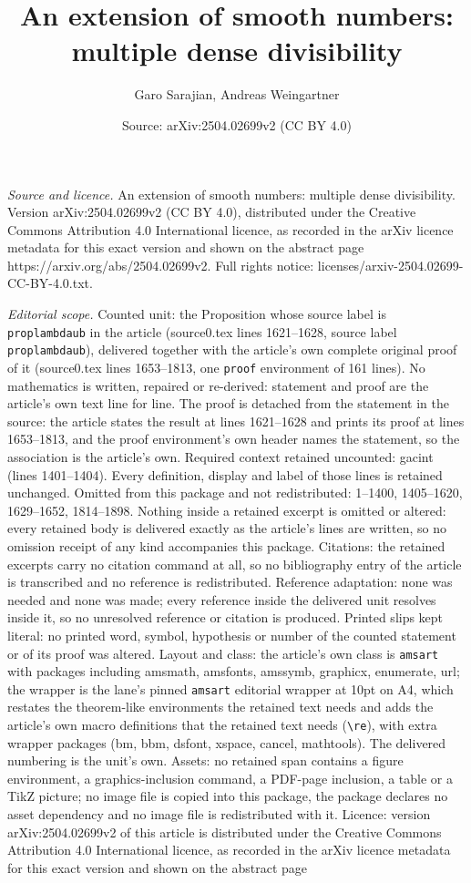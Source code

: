 \documentclass[10pt,a4paper]{amsart}
\title[An extension of smooth numbers: multiple dense divisibility]{An extension of smooth numbers: multiple dense divisibility}
\author{Garo Sarajian, Andreas Weingartner}
\date{Source: arXiv:2504.02699v2 (CC BY 4.0)}
\begin{document}
\maketitle

\noindent\emph{Source and licence.} An extension of smooth numbers: multiple dense divisibility. Version arXiv:2504.02699v2 (CC BY 4.0), distributed under the Creative Commons Attribution 4.0 International licence, as recorded in the arXiv licence metadata for this exact version and shown on the abstract page https://arxiv.org/abs/2504.02699v2. Full rights notice: licenses/arxiv-2504.02699-CC-BY-4.0.txt.\par\smallskip

\noindent\textit{Editorial scope.} Counted unit: the Proposition whose source label is \texttt{proplambdaub} in the article (source0.tex lines 1621--1628, source label \texttt{proplambdaub}), delivered together with the article's own complete original proof of it (source0.tex lines 1653--1813, one \texttt{proof} environment of 161 lines). No mathematics is written, repaired or re-derived: statement and proof are the article's own text line for line. The proof is detached from the statement in the source: the article states the result at lines 1621--1628 and prints its proof at lines 1653--1813, and the proof environment's own header names the statement, so the association is the article's own. Required context retained uncounted: gacint (lines 1401--1404). Every definition, display and label of those lines is retained unchanged. Omitted from this package and not redistributed: 1--1400, 1405--1620, 1629--1652, 1814--1898. Nothing inside a retained excerpt is omitted or altered: every retained body is delivered exactly as the article's lines are written, so no omission receipt of any kind accompanies this package. Citations: the retained excerpts carry no citation command at all, so no bibliography entry of the article is transcribed and no reference is redistributed. Reference adaptation: none was needed and none was made; every reference inside the delivered unit resolves inside it, so no unresolved reference or citation is produced. Printed slips kept literal: no printed word, symbol, hypothesis or number of the counted statement or of its proof was altered. Layout and class: the article's own class is \texttt{amsart} with packages including amsmath, amsfonts, amssymb, graphicx, enumerate, url; the wrapper is the lane's pinned \texttt{amsart} editorial wrapper at 10pt on A4, which restates the theorem-like environments the retained text needs and adds the article's own macro definitions that the retained text needs (\texttt{\textbackslash re}), with extra wrapper packages (bm, bbm, dsfont, xspace, cancel, mathtools). The delivered numbering is the unit's own. Assets: no retained span contains a figure environment, a graphics-inclusion command, a PDF-page inclusion, a table or a TikZ picture; no image file is copied into this package, the package declares no asset dependency and no image file is redistributed with it. Licence: version arXiv:2504.02699v2 of this article is distributed under the Creative Commons Attribution 4.0 International licence, as recorded in the arXiv licence metadata for this exact version and shown on the abstract page 
\end{document}
